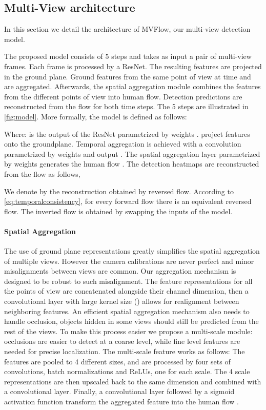 \documentclass[10pt,twocolumn,letterpaper]{article}
\begin{document}
\subsection{Multi-View architecture}

In this section we detail the architecture of MVFlow, our multi-view detection model.

The proposed model consists of 5 steps and takes as input a pair of multi-view frames. Each frame is processed by a ResNet. The resulting features are projected in the ground plane. Ground features from the same point of view at time  and  are aggregated. Afterwards, the spatial aggregation module combines the features from the different points of view into human flow.
Detection predictions are reconstructed from the flow for both time steps. The 5 steps are illustrated in \cref{fig:model}.
More formally, the model is defined as follows:


Where:
 is the output of the ResNet parametrized by weights .  project features onto the groundplane.
Temporal aggregation is achieved with a convolution parametrized by weights  and output . 
The spatial aggregation layer parametrized by weights  generates the human flow  .
The detection heatmaps  are reconstructed from the flow as follows,


We denote by  the reconstruction obtained by reversed flow. According to \cref{eq:temporalconsistency}, 
for every forward flow there is an equivalent reversed flow. The inverted flow  is obtained by swapping the inputs of the model.





\paragraph{Spatial Aggregation} The use of ground plane representations greatly simplifies the spatial aggregation of multiple views. 
However the camera calibrations are never perfect and minor misalignments between views are common. Our aggregation mechanism is designed to be robust to such misalignment.
The feature representations for all the points of view are concatenated alongside their channel dimension, then a convolutional layer with large kernel size () allows for realignment between neighboring features. 
An efficient spatial aggregation mechanism also needs to handle occlusion, objects hidden in some views should still be predicted from the rest of the views.
To make this process easier we propose a multi-scale module: occlusions are easier to detect at a coarse level, while fine level features are needed for precise localization.
The multi-scale feature works as follows: The features are pooled to 4 different sizes, and are processed by  four sets of convolutions, batch normalizations and ReLUs, one for each scale.
The 4 scale representations are then upscaled back to the same dimension and combined with a convolutional layer. 
Finally, a convolutional layer followed by a sigmoid activation function transform the aggregated feature into the human flow .
\end{document}
